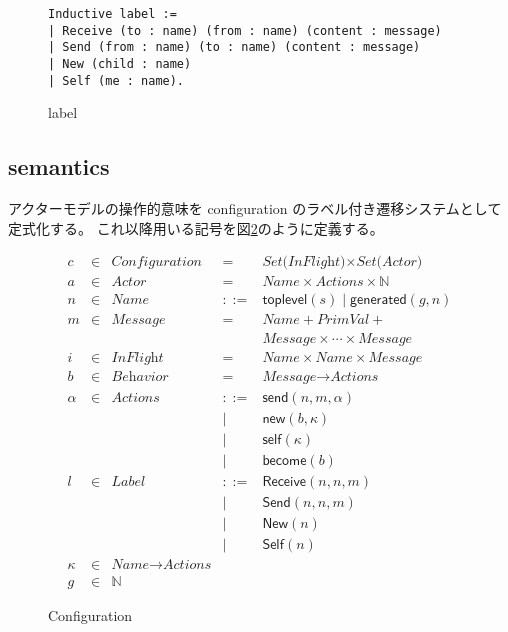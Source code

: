 \begin{figure}[tb]
  \begin{lstlisting}
Inductive label :=
| Receive (to : name) (from : name) (content : message)
| Send (from : name) (to : name) (content : message)
| New (child : name)
| Self (me : name).
  \end{lstlisting}
  \caption{label}\label{coq:label}
\end{figure}


\subsection{semantics}

アクターモデルの操作的意味を configuration のラベル付き遷移システムとして定式化する。
これ以降用いる記号を図\ref{fig:config}のように定義する。

\begin{figure}[tb]
  \begin{displaymath}
    \begin{array}{rclcl}
      c & \in & \textit{Configuration} & =   & \textit{Set(InFlight)} \times \textit{Set(Actor)} \\
      a & \in & \textit{Actor}  & =   & \textit{Name} \times \textit{Actions} \times \mathbb{N} \\
      n & \in & \textit{Name}   & ::= & \textsf{toplevel}(s) \mid \textsf{generated}(g, n) \\
      m & \in & \textit{Message} & =  & \textit{Name} + \textit{PrimVal} + \\
        &     &                 &     & \textit{Message} \times \cdots \times \textit{Message} \\
      i & \in & \textit{InFlight} & = & \textit{Name} \times \textit{Name} \times \textit{Message} \\
      b & \in & \textit{Behavior} & = & \textit{Message} \rightarrow \textit{Actions} \\
      \alpha & \in & \textit{Actions} & ::= & \textsf{send}(n, m, \alpha) \\
        &     &                 &   | & \textsf{new}(b, \kappa) \\
        &     &                 &   | & \textsf{self}(\kappa) \\
        &     &                 &   | & \textsf{become}(b) \\
      l & \in & \textit{Label}  & ::= & \textsf{Receive}(n, n, m) \\
        &     &                 &   | & \textsf{Send}(n, n, m) \\
        &     &                 &   | & \textsf{New}(n) \\
        &     &                 &   | & \textsf{Self}(n) \\
      \kappa & \in & \textit{Name} \rightarrow \textit{Actions} & & \\
      g & \in & \mathbb{N} & &
    \end{array}
  \end{displaymath}
  \caption{Configuration}\label{fig:config}
\end{figure}



